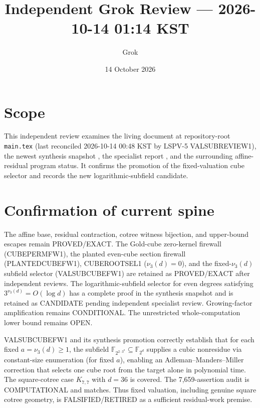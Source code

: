 \documentclass[11pt]{article}
\title{Independent Grok Review --- 2026-10-14 01:14 KST}
\author{Grok}
\date{14 October 2026}
\begin{document}
\maketitle

\begin{center}
\end{center}

\section{Scope}
This independent review examines the living document at repository-root \texttt{main.tex} (last reconciled 2026-10-14 00:48 KST by LSPV-5 VALSUBREVIEW1), the newest synthesis snapshot , the specialist report , and the surrounding affine-residual program status. It confirms the promotion of the fixed-valuation cube selector and records the new logarithmic-subfield candidate.

\section{Confirmation of current spine}
The affine base, residual contraction, cotree witness bijection, and upper-bound escapes remain PROVED/EXACT. The Gold-cube zero-kernel firewall (CUBEPERMFW1), the planted even-cube section firewall (PLANTEDCUBEFW1), CUBEROOTSEL1 ($\nu_3(d)=0$), and the fixed-$\nu_3(d)$ subfield selector (VALSUBCUBEFW1) are retained as PROVED/EXACT after independent reviews. The logarithmic-subfield selector for even degrees satisfying $3^{\nu_3(d)}=O(\log d)$ has a complete proof in the synthesis snapshot and is retained as CANDIDATE pending independent specialist review. Growing-factor amplification remains CONDITIONAL. The unrestricted whole-computation lower bound remains OPEN.

VALSUBCUBEFW1 and its synthesis promotion correctly establish that for each fixed $a=\nu_3(d)\ge1$, the subfield $\mathbb F_{2^{2\cdot3^a}}\subseteq\mathbb F_{2^d}$ supplies a cubic nonresidue via constant-size enumeration (for fixed $a$), enabling an Adleman--Manders--Miller correction that selects one cube root from the target alone in polynomial time. The square-cotree case $K_{7,7}$ with $d=36$ is covered. The 7,659-assertion audit is COMPUTATIONAL and matches. Thus fixed valuation, including genuine square cotree geometry, is FALSIFIED/RETIRED as a sufficient residual-work premise.
\end{document}
